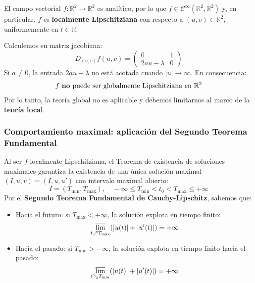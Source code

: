 El campo vectorial $f: \mathbb{R}^2 \to \mathbb{R}^2$ es analítico, por lo que $f \in \mathcal{C}^\infty(\mathbb{R}^2, \mathbb{R}^2)$ y, en particular, $f$ es \textbf{localmente Lipschitziana} con respecto a $(u, v) \in \mathbb{R}^2$, uniformemente en $t \in \mathbb{R}$.

Calculemos su matriz jacobiana:
\[
    D_{(u,v)} f(u, v) =
    \begin{pmatrix}
        0 & 1 \\
        2 a u - \lambda & 0
    \end{pmatrix}
\]
Si $a \neq 0$, la entrada $2 a u - \lambda$ no está acotada cuando $|u| \to \infty$. En consecuencia:
\[
    f \text{ \textbf{no} puede ser globalmente Lipschitziana en } \mathbb{R}^2
\]
Por lo tanto, la teoría global no es aplicable y debemos limitarnos al marco de la \textbf{teoría local}.

\subsubsection{Comportamiento maximal: aplicación del Segundo Teorema Fundamental}

Al ser $f$ localmente Lipschitziana, el Teorema de existencia de soluciones maximales garantiza la existencia de una única solución maximal $(I, u, v) = (I, u, u')$ con intervalo maximal abierto:
\[
    I = (T_{\min}, T_{\max}), \quad -\infty \leq T_{\min} < t_0 < T_{\max} \leq +\infty
\]
Por el \textbf{Segundo Teorema Fundamental de Cauchy-Lipschitz}, sabemos que:
\begin{itemize}
    \item Hacia el futuro: si $T_{\max} < +\infty$, la solución explota en tiempo finito:
    \[
        \varlimsup_{t \nearrow T_{\max}} (|u(t)| + |u'(t)|) = +\infty
    \]
    \item Hacia el pasado: si $T_{\min} > -\infty$, la solución explota en tiempo finito hacia el pasado:
    \[
        \varlimsup_{t \searrow T_{\min}} (|u(t)| + |u'(t)|) = +\infty
    \]
\end{itemize}


